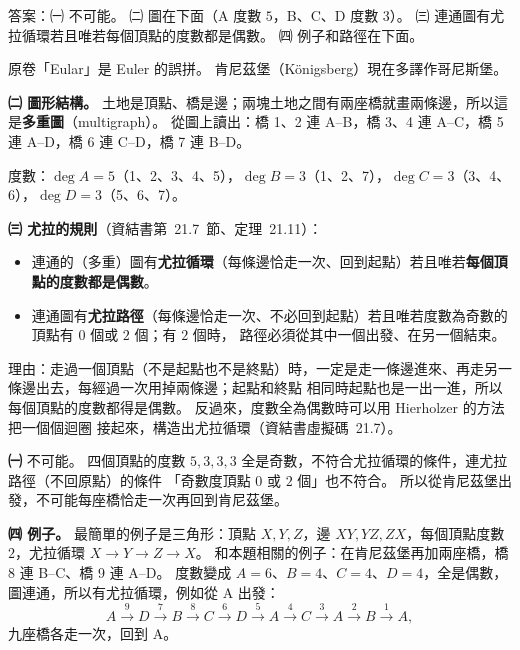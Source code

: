 \begin{pastsoln}
答案：㈠ 不可能。 ㈡ 圖在下面（A 度數 $5$，B、C、D 度數 $3$）。 ㈢ 連通圖有尤拉循環若且唯若每個頂點的度數都是偶數。
㈣ 例子和路徑在下面。

原卷「Eular」是 Euler 的誤拼。 肯尼茲堡（Königsberg）現在多譯作哥尼斯堡。

\textbf{㈡ 圖形結構。} 土地是頂點、橋是邊；兩塊土地之間有兩座橋就畫兩條邊，所以這是\textbf{多重圖}（multigraph）。
從圖上讀出：橋 1、2 連 A--B，橋 3、4 連 A--C，橋 5 連 A--D，橋 6 連 C--D，橋 7 連 B--D。
\begin{center}
\end{center}
度數：$\deg A = 5$（1、2、3、4、5），$\deg B = 3$（1、2、7），$\deg C = 3$（3、4、6），$\deg D = 3$（5、6、7）。

\textbf{㈢ 尤拉的規則}（資結書第~21.7~節、定理~21.11）：
\begin{itemize}
\item 連通的（多重）圖有\textbf{尤拉循環}（每條邊恰走一次、回到起點）若且唯若\textbf{每個頂點的度數都是偶數}。
\item 連通圖有\textbf{尤拉路徑}（每條邊恰走一次、不必回到起點）若且唯若度數為奇數的頂點有 $0$ 個或 $2$ 個；有 $2$ 個時，
路徑必須從其中一個出發、在另一個結束。
\end{itemize}
理由：走過一個頂點（不是起點也不是終點）時，一定是走一條邊進來、再走另一條邊出去，每經過一次用掉兩條邊；起點和終點
相同時起點也是一出一進，所以每個頂點的度數都得是偶數。 反過來，度數全為偶數時可以用 Hierholzer 的方法把一個個迴圈
接起來，構造出尤拉循環（資結書虛擬碼~21.7）。

\textbf{㈠} 不可能。 四個頂點的度數 $5, 3, 3, 3$ 全是奇數，不符合尤拉循環的條件，連尤拉路徑（不回原點）的條件
「奇數度頂點 $0$ 或 $2$ 個」也不符合。 所以從肯尼茲堡出發，不可能每座橋恰走一次再回到肯尼茲堡。

\textbf{㈣ 例子。} 最簡單的例子是三角形：頂點 $X, Y, Z$，邊 $XY, YZ, ZX$，每個頂點度數 $2$，尤拉循環
$X \to Y \to Z \to X$。 和本題相關的例子：在肯尼茲堡再加兩座橋，橋 8 連 B--C、橋 9 連 A--D。 度數變成
$A = 6$、$B = 4$、$C = 4$、$D = 4$，全是偶數，圖連通，所以有尤拉循環，例如從 A 出發：
\[
A \xrightarrow{9} D \xrightarrow{7} B \xrightarrow{8} C \xrightarrow{6} D \xrightarrow{5} A \xrightarrow{4} C
\xrightarrow{3} A \xrightarrow{2} B \xrightarrow{1} A,
\]
九座橋各走一次，回到 A。
\end{pastsoln}
